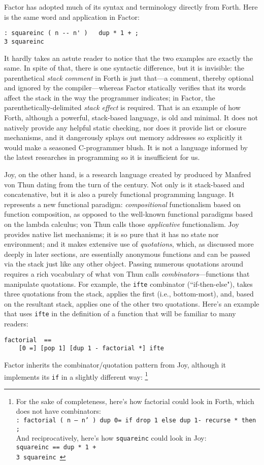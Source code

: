 \documentclass{sig-alternate}
\begin{document}
Factor has adopted much of its syntax and terminology directly from Forth. Here is the same word and application in Factor:
\begin{verbatim}
: squareinc ( n -- n' )   dup * 1 + ;
3 squareinc
\end{verbatim}

It hardly takes an astute reader to notice that the two examples are exactly the same. In spite of that, there is one syntactic difference, but it is invisible: the parenthetical \textit{stack comment} in Forth is just that---a comment, thereby optional and ignored by the compiler---whereas Factor statically verifies that its words affect the stack in the way the programmer indicates; in Factor, the parenthetically-delimited \textit{stack effect} is required. That is an example of how Forth, although a powerful, stack-based language, is old and minimal. It does not natively provide any helpful static checking, nor does it provide list or closure mechanisms, and it dangerously splays out memory addresses so explicitly it would make a seasoned C-programmer blush. It is not a language informed by the latest researches in programming so it is insufficient for us.

Joy, on the other hand, is a research language created by produced by Manfred von Thun dating from the turn of the century.\cite{JoyFaq} Not only is it stack-based and concatenative, but it is also a purely functional programming language. It represents a new functional paradigm: \textit{compositional} functionalism based on function composition, as opposed to the well-known functional paradigms based on the lambda calculus; von Thun calls those \textit{applicative} functionalism. Joy provides native list mechanisms; it is so pure that it has no state nor environment; and it makes extensive use of \textit{quotations}, which, as discussed more deeply in later sections, are essentially anonymous functions and can be passed via the stack just like any other object. Passing numerous quotations around requires a rich vocabulary of what von Thun calls \textit{combinators}---functions that manipulate quotations. For example, the \texttt{ifte} combinator (``if-then-else"), takes three quotations from the stack, applies the first (i.e., bottom-most), and, based on the resultant stack, applies one of the other two quotations. Here's an example that uses \texttt{ifte} in the definition of a function that will be familiar to many readers:\cite{JoyRec} 
\begin{verbatim}
factorial  ==
    [0 =] [pop 1] [dup 1 - factorial *] ifte
\end{verbatim}
Factor inherits the combinator/quotation pattern from Joy, although it implements its \texttt{if} in a slightly different way:
\footnote{ 
For the sake of completeness, here's how factorial could look in Forth, which does not have combinators:
\\
\texttt{: factorial ( n -- n' ) dup 0= if drop 1 else dup 1- recurse * then ;}
\\
And reciprocatively, here's how \texttt{squareinc} could look in Joy:
\\
\texttt{squareinc == dup * 1 +
\\
3 squareinc
}

}
\end{document}
